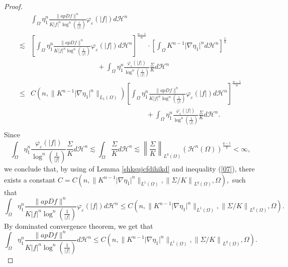 \documentclass[11pt,twoside]{article}
\theoremstyle{definition}
\theoremstyle{remark}
\newcommand{\aleq}{\lesssim}
\begin{document}
\begin{proof}
\begin{equation}
\begin{aligned}
&\int_{\Omega}\eta_{1}^{n}\frac{\parallel ap Df\parallel^{n}}{K\vert f\vert^{n}\log^{n}(\frac{1}{\vert f\vert})}\varphi_{\varepsilon}(\vert  f\vert)d\mathcal{H}^{n}\\
\aleq&  \left[\int_{\Omega}\eta_{1}^{n}\frac{\parallel ap Df\parallel^{n}}{K\vert f\vert^{n}\log^{n}(\frac{1}{\vert f\vert})}\varphi_{\varepsilon}(\vert  f\vert)d\mathcal{H}^{n}\right]^{\frac{n-1}{n}}\cdot\left[\int_{\Omega}K^{n-1}\vert\nabla\eta_{1}\vert^{n}d\mathcal{H}^{n}\right]^{\frac{1}{n}}\\
&\;\;\;\;\;\;\;\;\;\;\;\;\;\;\;\;\;\;\;\;\;\;\;\;\;\;\;\;\;\;\;\;\;\;+\int_{\Omega}\eta_{1}^{n}\frac{\varphi_{\varepsilon}(\vert  f\vert)}{\log^{n}(\frac{1}{\vert f\vert})}\frac{\Sigma}{K}d\mathcal{H}^{n}\\
\leq& C(n,\parallel K^{n-1}\vert\nabla\eta_{1}\vert^{n}\parallel_{L_{1}(\Omega)}) \left[\int_{\Omega}\eta_{1}^{n}\frac{\parallel ap Df\parallel^{n}}{K\vert f\vert^{n}\log^{n}(\frac{1}{\vert f\vert})}\varphi_{\varepsilon}(\vert  f\vert)d\mathcal{H}^{n}\right]^{\frac{n-1}{n}}\\
&\;\;\;\;\;\;\;\;\;\;\;\;\;\;\;\;\;\;\;\;\;\;\;\;\;\;\;\;\;\;\;\;\;\;\;\;\;\;\;\;\;\;\;\;\;\;\;\;\;\;\;\;\;\;\;\;\;\;\;+\int_{\Omega}\eta_{1}^{n}\frac{\varphi_{\varepsilon}(\vert  f\vert)}{\log^{n}(\frac{1}{\vert f\vert})}\frac{\Sigma}{K}d\mathcal{H}^{n}.\\
\end{aligned}
\end{equation}
Since $$\int_{\Omega}\eta_{1}^{n}\frac{\varphi_{\varepsilon}(\vert  f\vert)}{\log^{n}(\frac{1}{\vert f\vert})}\frac{\Sigma}{K}d\mathcal{H}^{n}\aleq\int_{\Omega}\frac{\Sigma}{K} d\mathcal{H}^{n}
\aleq\left\|\frac{\Sigma}{K}\right\|_{L^{q}(\Omega)}(\mathcal{H}^{n}(\Omega))^{\frac{q-1}{q}}<\infty,$$
we conclude that, by using of Lemma \ref{shksujcfdihikd} and inequality (\ref{07}), there exists a constant $C= C(n,\parallel K^{n-1}\vert\nabla\eta_{1}\vert^{n}\parallel_{L^{1}(\Omega)},\left\|\Sigma/K\right\|_{L^{q}(\Omega)},\Omega),$ such that 
\begin{equation}\label{sxnlxk}
\int_{\Omega}\eta_{1}^{n}\frac{\| ap Df\|^{n}}{K\vert f\vert^{n}\log^{n}(\frac{1}{\vert f\vert})}\varphi_{\varepsilon}(\vert  f\vert)d\mathcal{H}^{n}\leq C(n,\| K^{n-1}\vert\nabla\eta_{1}\vert^{n}\|_{L^{1}(\Omega)},\left\|\Sigma/K\right\|_{L^{q}(\Omega)},\Omega).
\end{equation}
By dominated convergence theorem, we get that 
\begin{equation}\label{sxnlxk}
\int_{\Omega}\eta_{1}^{n}\frac{\| ap Df\|^{n}}{K\vert f\vert^{n}\log^{n}(\frac{1}{\vert f\vert})}d\mathcal{H}^{n}\leq C(n,\| K^{n-1}\vert\nabla\eta_{1}\vert^{n}\|_{L^{1}(\Omega)},\left\|\Sigma/K\right\|_{L^{q}(\Omega)},\Omega).

\end{equation}
\end{proof}
\end{document}
